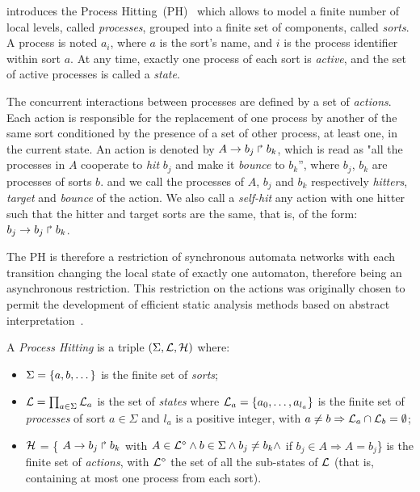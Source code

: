  introduces the Process Hitting~(PH)~\cite{PMR10-TCSB}
which allows to model a finite number of local levels,
called \emph{processes},
grouped into a finite set of components, called \emph{sorts}.
A process is noted $a_i$, where $a$ is the sort's name,
and $i$ is the process identifier within sort $a$.
At any time, exactly one process of each sort is \emph{active},
and the set of active processes is called a \emph{state}.

The concurrent interactions between processes are defined by a set of \emph{actions}.
Each action is responsible for the replacement of one process by another of the same sort
conditioned by the presence of a set of other process, at least one, in the current state.
An action is denoted by $A\rightarrow b_j\Rsh b_k$, which is read as "all the processes in $A$ cooperate to \emph{hit} $b_j$ and make it \emph{bounce} to $b_k$'',
where $b_j$, $b_k$ are processes of sorts $b$.
and we call the processes of $A$, $b_j$ and $b_k$  respectively \emph{hitters}, \emph{target} and
\emph{bounce} of the action.
We also call a \emph{self-hit} any action with one hitter such that the hitter and target sorts are the same,
that is, of the form: $b_j\rightarrow b_j\Rsh b_k$.

The PH is therefore a restriction of synchronous automata networks with each transition
changing the local state of exactly one automaton,
therefore being an asynchronous restriction.
This restriction on the actions was originally chosen to permit
the development of efficient static analysis methods
based on abstract interpretation~\cite{PMR12-MSCS}.

\begin{definition}\label{def:PH}
  A \emph{Process Hitting} is a triple $(\Sigma,\mathcal{L},\mathcal{H})$ where:
  \begin{itemize}
    \item  $\Sigma = \{a,b,\dots\}$ is the finite set of \emph{sorts};
    \item  $\mathcal{L} = \prod_{a\in\Sigma} \mathcal{L}_a$ is the set of \emph{states} where
      $\mathcal{L}_a = \{a_0,\dots,a_{l_a}\}$
      is the finite set of \emph{processes} of sort $a\in\Sigma$
      and $l_a$ is a positive integer, with $a\neq b\Rightarrow \mathcal{L}_a \cap \mathcal{L}_b = \emptyset$;
    \item $\mathcal{H}$ = \{ $A\rightarrow b_j\Rsh b_k$ with $A \in \mathcal{L}^{\diamond} \wedge b \in \Sigma \wedge b_j \neq b_k \wedge$ if $b_j \in A \Rightarrow A=b_j$\} is the finite set of \emph{actions},
    with $\mathcal{L}^{\diamond}$ the set of all the sub-states of $\mathcal{L}$
    (that is, containing at most one process from each sort).
  \end{itemize}
\end{definition}

